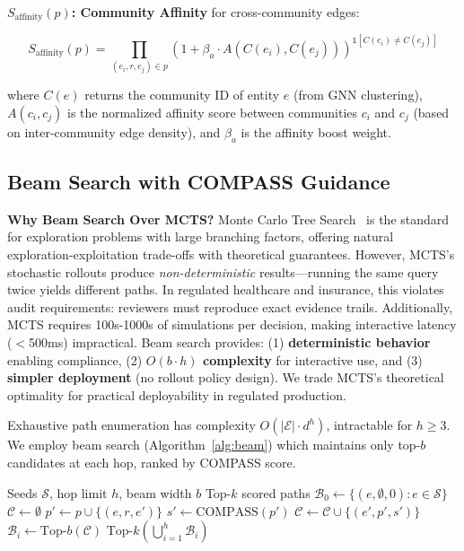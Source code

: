 \documentclass[10pt,twocolumn]{article}
\begin{document}
\textbf{$S_{\text{affinity}}(p)$: Community Affinity} for cross-community edges:

\begin{equation}
S_{\text{affinity}}(p) = \prod_{(e_i, r, e_j) \in p} \left(1 + \beta_a \cdot A(C(e_i), C(e_j))\right)^{\mathbb{1}[C(e_i) \neq C(e_j)]}
\end{equation}

where $C(e)$ returns the community ID of entity $e$ (from GNN clustering), $A(c_i, c_j)$ is the normalized affinity score between communities $c_i$ and $c_j$ (based on inter-community edge density), and $\beta_a$ is the affinity boost weight.

\subsection{Beam Search with COMPASS Guidance}

\textbf{Why Beam Search Over MCTS?} Monte Carlo Tree Search~\cite{browne2012survey} is the standard for exploration problems with large branching factors, offering natural exploration-exploitation trade-offs with theoretical guarantees. However, MCTS's stochastic rollouts produce \textit{non-deterministic} results—running the same query twice yields different paths. In regulated healthcare and insurance, this violates audit requirements: reviewers must reproduce exact evidence trails. Additionally, MCTS requires 100s-1000s of simulations per decision, making interactive latency ($<$500ms) impractical. Beam search provides: (1) \textbf{deterministic behavior} enabling compliance, (2) \textbf{$O(b \cdot h)$ complexity} for interactive use, and (3) \textbf{simpler deployment} (no rollout policy design). We trade MCTS's theoretical optimality for practical deployability in regulated production.

Exhaustive path enumeration has complexity $O(|\mathcal{E}| \cdot d^h)$, intractable for $h \geq 3$. We employ beam search (Algorithm~\ref{alg:beam}) which maintains only top-$b$ candidates at each hop, ranked by COMPASS score.

\begin{algorithm}[t]
\caption{Beam Search with COMPASS Scoring}
\label{alg:beam}
\begin{algorithmic}[1]
\REQUIRE Seeds $\mathcal{S}$, hop limit $h$, beam width $b$
\ENSURE Top-$k$ scored paths
\STATE $\mathcal{B}_0 \gets \{(e, \emptyset, 0) : e \in \mathcal{S}\}$ 
    \STATE $\mathcal{C} \gets \emptyset$ 
            \STATE $p' \gets p \cup \{(e, r, e')\}$
            \STATE $s' \gets \text{COMPASS}(p')$ 
            \STATE $\mathcal{C} \gets \mathcal{C} \cup \{(e', p', s')\}$
        \ENDFOR
    \ENDFOR
    \STATE $\mathcal{B}_i \gets \text{Top-}b(\mathcal{C})$ 
\ENDFOR
\RETURN $\text{Top-}k(\bigcup_{i=1}^{h} \mathcal{B}_i)$
\end{algorithmic}
\end{algorithm}
\end{document}
